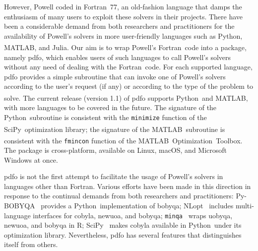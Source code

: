 \documentclass[11pt,draft]{article}
\numberwithin{equation}{section}
\def\fortran{\mbox{Fortran}}
\def\julia{\mbox{Julia}}
\def\matlab{\mbox{MATLAB\textsuperscript{\textregistered}}}
\def\matlabopt{\mbox{\matlab\ Optimization Toolbox\textsuperscript{\texttrademark}}}
\def\minqa{\mbox{\texttt{minqa}}}
\def\nlopt{\mbox{NLopt}}
\def\pybobyqa{\mbox{Py-BOBYQA}}
\def\python{\mbox{Python}}
\def\rlang{\mbox{R}}
\def\scipy{\mbox{SciPy}}
\begin{document}
However, Powell coded in \fortran\ 77, an old-fashion language that damps the enthusiasm of many users to exploit these solvers in their projects.
There have been a considerable demand from both researchers and practitioners for the availability of Powell's solvers in more user-friendly languages such as \python, \matlab, and \julia.
Our aim is to wrap Powell's \fortran\ code into a package, namely \gls{pdfo}, which enables users of such languages to call Powell's solvers without any need of dealing with the \fortran\ code.
For each supported language, \gls{pdfo} provides a simple subroutine that can invoke one of Powell's solvers according to the user's request (if any) or according to the type of the problem to solve. The current release (version 1.1) of \gls{pdfo} supports \python\ and \matlab, with more languages to be covered in the future.
The signature of the \python\ subroutine is consistent with the \texttt{minimize} function of the \scipy\ optimization library;
the signature of the \matlab\ subroutine is consistent with the \texttt{fmincon} function of the \matlabopt.
The package is cross-platform, available on Linux, macOS, and Microsoft Windows at once.

\gls{pdfo} is not the first attempt to facilitate the usage of Powell's solvers in languages other than \fortran.
Various efforts have been made in this direction in response to the continual demands from both researchers and practitioners: \pybobyqa~\cite{Cartis_Etal_2019} provides a \python\ implementation of \gls{bobyqa}; \nlopt~\cite{Johnson_2019} includes multi-language interfaces for \gls{cobyla}, \gls{newuoa}, and \gls{bobyqa}; \minqa~\cite{Bates_Etal_2014} wraps \gls{uobyqa}, \gls{newuoa}, and \gls{bobyqa} in \rlang; \scipy~\cite{Virtanen_Etal_2020} makes \gls{cobyla} available in \python\ under its optimization library. Nevertheless, \gls{pdfo} has several features that distinguishes itself from others.
\end{document}
